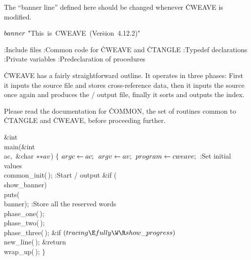The ``banner line'' defined here should be changed whenever \.{CWEAVE}
is modified.

\Y\B\4\D$\\{banner}$ \5
\.{"This\ is\ CWEAVE\ (Ver}\)\.{sion\ 4.12.2)"}\par
\Y\B{}:Include files\X\6
\ATH\6
:Common code for \.{CWEAVE} and \.{CTANGLE}\X\6
:Typedef declarations\X\6
:Private variables\X\6
:Predeclaration of procedures\X\par
\fi

\.{CWEAVE} has a fairly straightforward outline.  It operates in
three phases: First it inputs the source file and stores cross-reference
data, then it inputs the source once again and produces the \TEX/ output
file, finally it sorts and outputs the index.

Please read the documentation for \.{COMMON}, the set of routines common
to \.{CTANGLE} and \.{CWEAVE}, before proceeding further.

\Y\B\1\1\&{int} \\{main}(\&{int} \\{ac}${},{}$\6
\&{char} ${}{*}{*}\\{av}{}$)\2\2\6
${}\{{}$\1\6
${}\\{argc}\leftarrow\\{ac};{}$\6
${}\\{argv}\leftarrow\\{av};{}$\6
${}\\{program}\leftarrow\\{cweave};{}$\6
:Set initial values\X\6
\\{common\_init}(\,);\6
:Start \TEX/ output\X\6
\&{if} (\\{show\_banner})\1\5
\\{puts}(\\{banner});\2\6
:Store all the reserved words\X\6
\\{phase\_one}(\,);\6
\\{phase\_two}(\,);%
\6
\\{phase\_three}(\,);\6
\&{if} ${}(\\{tracing}\E\\{fully}\W\R\\{show\_progress}){}$\1\5
\\{new\_line}(\,);\2\6
\&{return} \\{wrap\_up}(\,);\6
\4${}\}{}$\2\par
\fi

